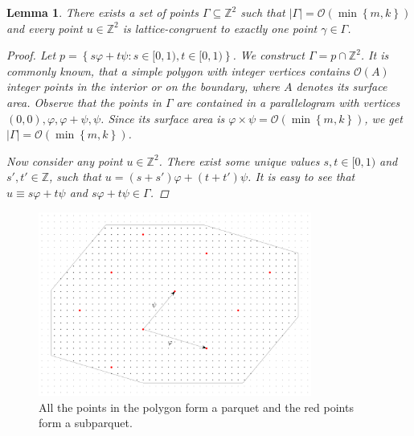 \documentclass[11pt]{article}
\newcommand{\Z}{\mathbb{Z}}
\renewcommand{\O}{\mathcal{O}}
\renewcommand{\phi}{\varphi}
\newcommand{\set}[1]{\left\lbrace #1 \right\rbrace}
\theoremstyle{plain}
\newtheorem{lemma}{Lemma}
\theoremstyle{definition}
\theoremstyle{remark}
\begin{document}
\begin{lemma} \label{lattice_base}
	There exists a set of points $\Gamma \subseteq \Z^2$ such that $|\Gamma| = \O(\min\set{m, k})$ and every point $u \in \Z^2$ is lattice-congruent to exactly one point $\gamma \in \Gamma$.
	\begin{proof}
		Let $p = \set{s\phi + t\psi : s \in [0, 1), t \in [0, 1)}$.
		We construct $\Gamma = p \cap \Z^2$.
		It is commonly known, that a simple polygon with integer vertices contains $\O(A)$ integer points in the interior or on the boundary, where $A$ denotes its surface area.
		Observe that the points in $\Gamma$ are contained in a parallelogram with vertices $(0, 0), \phi, \phi + \psi, \psi$.
		Since its surface area is $\phi \times \psi = \O(\min\set{m, k})$, we get $|\Gamma| = \O(\min\set{m, k})$.
		
		Now consider any point $u \in \Z^2$.
		There exist some unique values $s, t \in [0, 1)$ and $s', t' \in \Z$, such that
		$u = (s + s') \phi + (t + t') \psi$.
		It is easy to see that
		$u \equiv s\phi + t\psi$ and $s\phi + t\psi \in \Gamma$.
	\end{proof}
\end{lemma}

\begin{figure}[!t]
	\begin{center}
		\includegraphics[width=0.8\textwidth]{drawings/parquet}
	\end{center}
	\caption{All the points in the polygon form a parquet and the red points form a subparquet.}
	\label{figure:parquet}
\end{figure}
\end{document}
